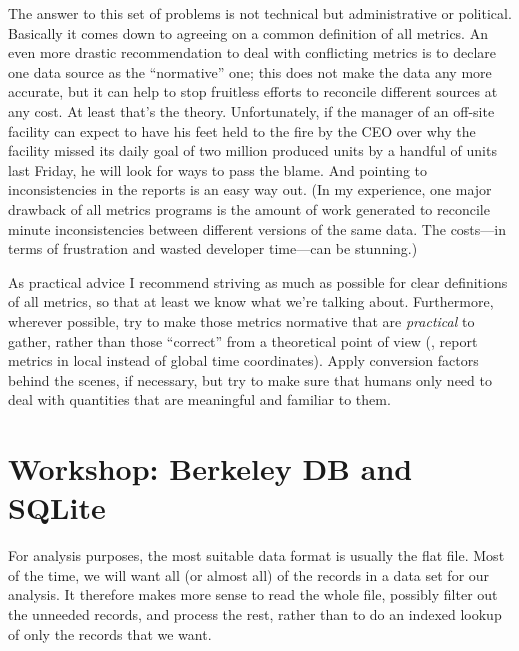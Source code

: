 The answer to this set of problems is not technical but
administrative or political. Basically it comes down to agreeing on a
common definition of all metrics. An even more drastic recommendation
to deal with conflicting metrics is to declare one data source as the
``normative'' one; this does not make the data any more accurate, but
it can help to stop fruitless efforts to reconcile different sources
at any cost. At least that's the theory.  Unfortunately, if the
manager of an off-site facility can expect to have his feet held to
the fire by the CEO over why the facility missed its daily goal of two
million produced units by a handful of units last Friday, he will look
for ways to pass the blame. And pointing to inconsistencies in the
reports is an easy way out. (In my experience, one major drawback of
all metrics programs is the amount of work generated to reconcile
minute inconsistencies between different versions of the same data.
The costs---in terms of frustration and wasted developer time---can be
stunning.)
    
As practical advice I recommend striving as much as possible for clear
definitions of all metrics, so that at least we know what we're
talking about. Furthermore, wherever possible, try to make those
metrics normative that are \emph{practical} to gather, rather than
those ``correct'' from a theoretical point of view (\eg, report
metrics in local instead of global time coordinates). Apply conversion
factors behind the scenes, if necessary, but try to make sure that
humans only need to deal with quantities that are meaningful and
familiar to them.


\vspace*{-9pt}
\section{Workshop: Berkeley DB and SQLite}


For analysis purposes, the most suitable data format is usually the
flat file. Most of the time, we will want all (or almost all) of the
records in a data set for our analysis. It therefore makes more sense
to read the whole file, possibly filter out the unneeded records, and
process the rest, rather than to do an indexed lookup of only the
records that we want.

